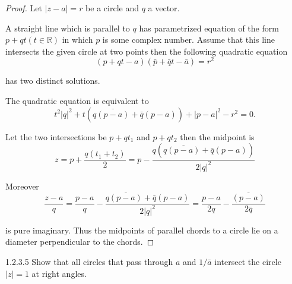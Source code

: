 \begin{proof}
	Let \( \left\vert z - a \right\vert = r \) be a circle and \( q \) a vector.

	A straight line which is parallel to \( q \) has parametrized equation of the form \( p + qt (t \in \mathbb{R}) \) in which \( p \) is some complex number. Assume that this line intersects the given circle at two points then the following quadratic equation
	\[
		(p + qt - a)(\bar{p} + \bar{q}t - \bar{a}) = r^{2}
	\]

	has two distinct solutions.

	The quadratic equation is equivalent to
	\[
		t^{2} {\left\vert q \right\vert}^{2} + t(q\overline{(p - a)} + \bar{q}(p - a)) + {\left\vert p - a\right\vert}^{2} - r^{2} = 0.
	\]

	Let the two intersections be \( p + qt_{1} \) and \( p + qt_{2} \) then the midpoint is
	\[
		z = p + \dfrac{q(t_{1} + t_{2})}{2} = p - \dfrac{q(q\overline{(p - a)} + \bar{q}(p - a))}{2{\left\vert q\right\vert}^{2}}
	\]

	Moreover
	\[
		\dfrac{z - a}{q} = \dfrac{p - a}{q} - \dfrac{q\overline{(p - a)} + \bar{q}(p - a)}{2{\left\vert q\right\vert}^{2}} = \dfrac{p - a}{2q} - \frac{\overline{(p - a)}}{2\bar{q}}
	\]

	is pure imaginary. Thus the midpoints of parallel chords to a circle lie on a diameter perpendicular to the chords.
\end{proof}

\begin{problem}{1.2.3.5}
Show that all circles that pass through \( a \) and \( 1/\bar{a} \) intersect the circle \( \left\vert z \right\vert = 1 \) at right angles.
\end{problem}

